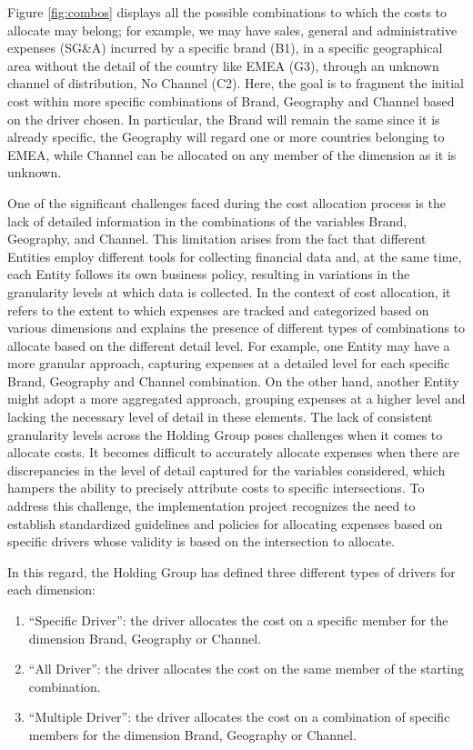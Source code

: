 \documentclass[12pt,a4paper,openright,twoside]{book}
\begin{document}
Figure \ref{fig:combos} displays all the possible combinations to which the costs to allocate may belong; for example, we may have sales, general and administrative expenses (SG\&A) incurred by a specific brand (B1), in a specific geographical area without the detail of the country like EMEA (G3), through an unknown channel of distribution, No Channel (C2).
%
Here, the goal is to fragment the initial cost within more specific combinations of Brand, Geography and Channel based on the driver chosen.
%
In particular, the Brand will remain the same since it is already specific, the Geography will regard one or more countries belonging to EMEA, while Channel can be allocated on any member of the dimension as it is unknown.

One of the significant challenges faced during the cost allocation process is the lack of detailed information in the combinations of the variables Brand, Geography, and Channel.
%
This limitation arises from the fact that different Entities employ different tools for collecting financial data and, at the same time, each Entity follows its own business policy, resulting in variations in the granularity levels at which data is collected.
%
In the context of cost allocation, it refers to the extent to which expenses are tracked and categorized based on various dimensions and explains the presence of different types of combinations to allocate based on the different detail level.
%
For example, one Entity may have a more granular approach, capturing expenses at a detailed level for each specific Brand, Geography and Channel combination. 
%
On the other hand, another Entity might adopt a more aggregated approach, grouping expenses at a higher level and lacking the necessary level of detail in these elements.
%
The lack of consistent granularity levels across the Holding Group poses challenges when it comes to allocate costs.
%
It becomes difficult to accurately allocate expenses when there are discrepancies in the level of detail captured for the variables considered, which hampers the ability to precisely attribute costs to specific intersections.
%
To address this challenge, the implementation project recognizes the need to establish standardized guidelines and policies for allocating expenses based on specific drivers whose validity is based on the intersection to allocate.

In this regard, the Holding Group has defined three different types of drivers for each dimension:

\begin{enumerate}
    \item ``Specific Driver'': the driver allocates the cost on a specific member for the dimension Brand, Geography or Channel.
    \item ``All Driver'': the driver allocates the cost on the same member of the starting combination.
    \item ``Multiple Driver'': the driver allocates the cost on a combination of specific members for the dimension Brand, Geography or Channel.
\end{enumerate}
\end{document}

